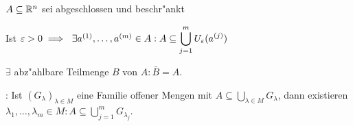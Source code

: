 \documentclass[a4paper,twoside,DIV15,BCOR12mm]{scrbook}
\begin{document}
\begin{satz}[Überdeckungen]
$A \subseteq \mathbb{R}^n$ sei abgeschlossen und beschr"ankt
\begin{liste}
\item Ist $\varepsilon>0\implies\ \exists a^{(1)},\ldots,a^{(m)} \in A: A\subseteq \displaystyle\bigcup_{j=1}^m U_\varepsilon(a^{(j)})$
\item $\exists$ abz"ahlbare Teilmenge $B$ von $A: \bar B=A$.
\item {}: Ist $(G_\lambda)_{\lambda \in M}$ eine Familie offener Mengen mit $A \subseteq \displaystyle\bigcup_{\lambda \in M} G_\lambda$, dann existieren $\lambda_1, \ldots, \lambda_m \in M: A\subseteq \displaystyle\bigcup_{j=1}^m G_{\lambda_j}$.
\end{liste}
\end{satz}
\end{document}
